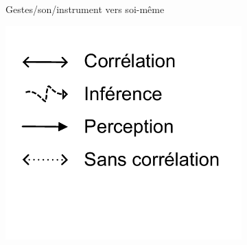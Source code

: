 \begin{figure}[!htbp]
{\begin{subfigure}[b]{.33\textwidth}
			\caption{Gestes/son/instrument vers soi-même}
		\end{subfigure}%
		\hspace{.02\linewidth}
		\begin{subfigure}[b]{.33\textwidth}
			\centering
			\includegraphics[width=0.9\linewidth]{gfx/03_gesture/gesture-inference-legendeR.pdf}
		\end{subfigure}%
	}\\
\end{figure}
